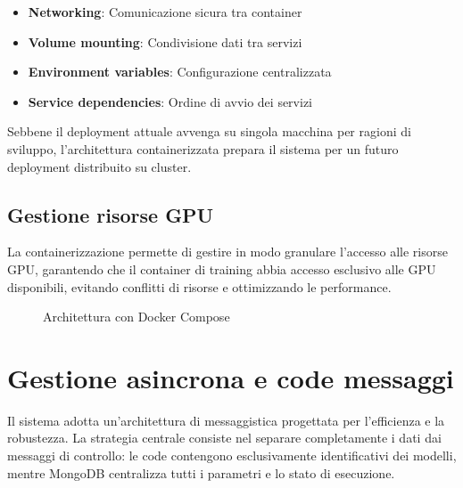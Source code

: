 \begin{itemize}
    \item \textbf{Networking}: Comunicazione sicura tra container
    \item \textbf{Volume mounting}: Condivisione dati tra servizi
    \item \textbf{Environment variables}: Configurazione centralizzata
    \item \textbf{Service dependencies}: Ordine di avvio dei servizi
\end{itemize}

Sebbene il deployment attuale avvenga su singola macchina per ragioni di sviluppo, l'architettura containerizzata prepara il sistema per un futuro deployment distribuito su cluster.

\subsection{Gestione risorse GPU}
La containerizzazione permette di gestire in modo granulare l'accesso alle risorse GPU, garantendo che il container di training abbia accesso esclusivo alle GPU disponibili, evitando conflitti di risorse e ottimizzando le performance.

\begin{figure}[htbp]
	\centering
	\caption{Architettura con Docker Compose}
	\label{fig:docker_compose}
\end{figure}

\newpage

\section{Gestione asincrona e code messaggi}
Il sistema adotta un'architettura di messaggistica progettata per l'efficienza e la robustezza. La strategia centrale consiste nel separare completamente i dati dai messaggi di controllo: le code contengono esclusivamente identificativi dei modelli, mentre MongoDB centralizza tutti i parametri e lo stato di esecuzione.

